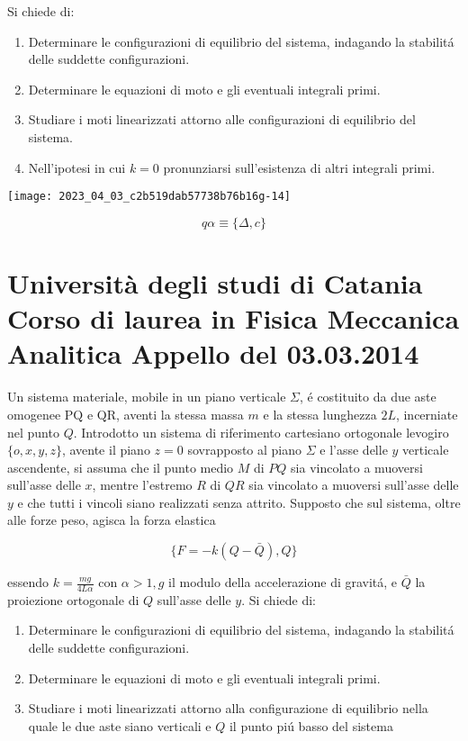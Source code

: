 \documentclass[10pt]{article}
\begin{document}
Si chiede di:

\begin{enumerate}
  \item Determinare le configurazioni di equilibrio del sistema, indagando la stabilitá delle suddette configurazioni.

  \item Determinare le equazioni di moto e gli eventuali integrali primi.

  \item Studiare i moti linearizzati attorno alle configurazioni di equilibrio del sistema.

  \item Nell'ipotesi in cui \(k=0\) pronunziarsi sull'esistenza di altri integrali primi.

\end{enumerate}

\begin{center}
\texttt{[image: 2023\_04\_03\_c2b519dab57738b76b16g-14]}
\end{center}

\[
q \alpha \equiv\{\Delta, c\}
\]

\section{Università degli studi di Catania
Corso di laurea in Fisica
Meccanica Analitica
Appello del 03.03.2014}
Un sistema materiale, mobile in un piano verticale \(\Sigma\), é costituito da due aste omogenee \(\mathrm{PQ}\) e \(\mathrm{QR}\), aventi la stessa massa \(m\) e la stessa lunghezza \(2 L\), incerniate nel punto \(Q\). Introdotto un sistema di riferimento cartesiano ortogonale levogiro \(\{o, x, y, z\}\), avente il piano \(z=0\) sovrapposto al piano \(\Sigma\) e l'asse delle \(y\) verticale ascendente, si assuma che il punto medio \(M\) di \(P Q\) sia vincolato a muoversi sull'asse delle \(x\), mentre l'estremo \(R\) di \(Q R\) sia vincolato a muoversi sull'asse delle \(y\) e che tutti i vincoli siano realizzati senza attrito. Supposto che sul sistema, oltre alle forze peso, agisca la forza elastica

\[
\{F=-k(Q-\bar{Q}), Q\}
\]

essendo \(k=\frac{m g}{4 L \alpha}\) con \(\alpha>1, g\) il modulo della accelerazione di gravitá, e \(\bar{Q}\) la proiezione ortogonale di \(Q\) sull'asse delle \(y\). Si chiede di:

\begin{enumerate}
  \item Determinare le configurazioni di equilibrio del sistema, indagando la stabilitá delle suddette configurazioni.

  \item Determinare le equazioni di moto e gli eventuali integrali primi.

  \item Studiare i moti linearizzati attorno alla configurazione di equilibrio nella quale le due aste siano verticali e \(Q\) il punto piú basso del sistema

\end{enumerate}
\end{document}
